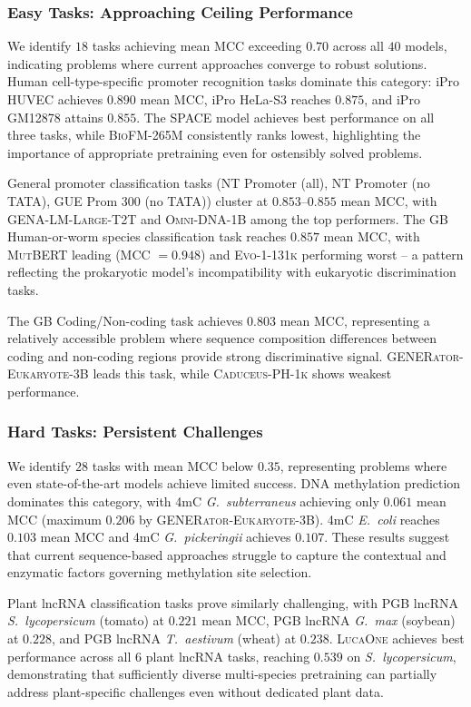 \documentclass{llmxive}
\begin{document}
\subsubsection{Easy Tasks: Approaching Ceiling Performance}

We identify $18$ tasks achieving mean MCC exceeding $0.70$
across all $40$ models, indicating problems where current
approaches converge to robust solutions. Human cell-type-specific
promoter recognition tasks dominate this category: iPro HUVEC
achieves $0.890$ mean MCC, iPro HeLa-S3 reaches $0.875$, and
iPro GM12878 attains $0.855$. The \textsc{SPACE} model achieves
best performance on all three tasks, while \textsc{BioFM-265M}
consistently ranks lowest, highlighting the importance of
appropriate pretraining even for ostensibly solved problems.

General promoter classification tasks (NT Promoter (all), NT
Promoter (no TATA), GUE Prom 300 (no TATA)) cluster at
$0.853$--$0.855$ mean MCC, with \textsc{GENA-LM-Large-T2T} and
\textsc{Omni-DNA-1B} among the top performers. The GB
Human-or-worm species classification task reaches $0.857$ mean
MCC, with \textsc{MutBERT} leading (MCC $= 0.948$) and
\textsc{Evo-1-131k} performing worst -- a pattern reflecting the
prokaryotic model's incompatibility with eukaryotic
discrimination tasks.

The GB Coding/Non-coding task achieves $0.803$ mean MCC,
representing a relatively accessible problem where sequence
composition differences between coding and non-coding regions
provide strong discriminative signal.
\textsc{GENERator-Eukaryote-3B} leads this task, while
\textsc{Caduceus-PH-1k} shows weakest performance.

\subsubsection{Hard Tasks: Persistent Challenges}

We identify $28$ tasks with mean MCC below $0.35$, representing
problems where even state-of-the-art models achieve limited
success. DNA methylation prediction dominates this category,
with 4mC \emph{G.\ subterraneus} achieving only $0.061$ mean MCC
(maximum $0.206$ by \textsc{GENERator-Eukaryote-3B}). 4mC
\emph{E.\ coli} reaches $0.103$ mean MCC and 4mC
\emph{G.\ pickeringii} achieves $0.107$. These results suggest
that current sequence-based approaches struggle to capture the
contextual and enzymatic factors governing methylation site
selection.

Plant lncRNA classification tasks prove similarly challenging,
with PGB lncRNA \emph{S.\ lycopersicum} (tomato) at $0.221$ mean
MCC, PGB lncRNA \emph{G.\ max} (soybean) at $0.228$, and PGB
lncRNA \emph{T.\ aestivum} (wheat) at $0.238$. \textsc{LucaOne}
achieves best performance across all $6$ plant lncRNA tasks,
reaching $0.539$ on \emph{S.\ lycopersicum}, demonstrating that
sufficiently diverse multi-species pretraining can partially
address plant-specific challenges even without dedicated plant
data.
\end{document}
